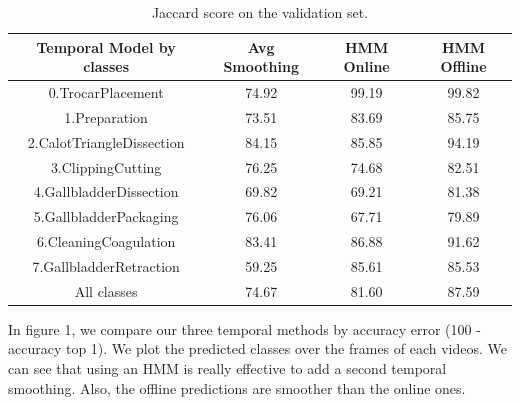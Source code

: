\documentclass[10pt,twocolumn,letterpaper]{article}
\begin{document}
\begin{table}
	\begin{center}
		\begin{tabular}{|c|c|c|c|}
			\hline
			Temporal Model by classes & Avg Smoothing & HMM Online & HMM Offline \\
			\hline \hline
			0.TrocarPlacement & 74.92 & 99.19 & 99.82 \\
			1.Preparation & 73.51 & 83.69 & 85.75 \\
			2.CalotTriangleDissection & 84.15 & 85.85 &  94.19 \\
			3.ClippingCutting & 76.25 & 74.68 & 82.51 \\
			4.GallbladderDissection & 69.82 & 69.21 & 81.38 \\
			5.GallbladderPackaging & 76.06 & 67.71 & 79.89 \\
			6.CleaningCoagulation & 83.41 & 86.88 & 91.62 \\
			7.GallbladderRetraction & 59.25 & 85.61 & 85.53 \\
			\hline
			All classes & 74.67 & 81.60 & 87.59 \\
			\hline
		\end{tabular}
	\end{center}
	\caption{Jaccard score on the validation set.}
\end{table}

In figure 1, we compare our three temporal methods by accuracy error (100 - accuracy top 1). We plot the predicted classes over the frames of each videos. We can see that using an HMM is really effective to add a second temporal smoothing. Also, the offline predictions are smoother than the online ones.
\end{document}
